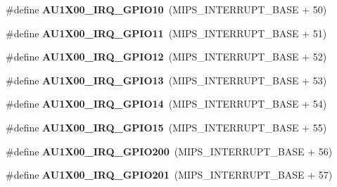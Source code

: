 \begin{DoxyCompactItemize}
\item 
\mbox{\label{group__bsp__interrupt_ga186ea493bfff4e9d0f015101ee9b39fb}} 
\#define {\bfseries A\+U1\+X00\+\_\+\+I\+R\+Q\+\_\+\+G\+P\+I\+O10}~(M\+I\+P\+S\+\_\+\+I\+N\+T\+E\+R\+R\+U\+P\+T\+\_\+\+B\+A\+SE + 50)
\item 
\mbox{\label{group__bsp__interrupt_ga75709136fa2a0302388f5482d91d5caf}} 
\#define {\bfseries A\+U1\+X00\+\_\+\+I\+R\+Q\+\_\+\+G\+P\+I\+O11}~(M\+I\+P\+S\+\_\+\+I\+N\+T\+E\+R\+R\+U\+P\+T\+\_\+\+B\+A\+SE + 51)
\item 
\mbox{\label{group__bsp__interrupt_ga9baa0287ccd46f700ad90bc943e0935a}} 
\#define {\bfseries A\+U1\+X00\+\_\+\+I\+R\+Q\+\_\+\+G\+P\+I\+O12}~(M\+I\+P\+S\+\_\+\+I\+N\+T\+E\+R\+R\+U\+P\+T\+\_\+\+B\+A\+SE + 52)
\item 
\mbox{\label{group__bsp__interrupt_gaff07113de52c2a2bf9b4946a01313802}} 
\#define {\bfseries A\+U1\+X00\+\_\+\+I\+R\+Q\+\_\+\+G\+P\+I\+O13}~(M\+I\+P\+S\+\_\+\+I\+N\+T\+E\+R\+R\+U\+P\+T\+\_\+\+B\+A\+SE + 53)
\item 
\mbox{\label{group__bsp__interrupt_ga2000ed0ba873113e01308e0e06d04e9e}} 
\#define {\bfseries A\+U1\+X00\+\_\+\+I\+R\+Q\+\_\+\+G\+P\+I\+O14}~(M\+I\+P\+S\+\_\+\+I\+N\+T\+E\+R\+R\+U\+P\+T\+\_\+\+B\+A\+SE + 54)
\item 
\mbox{\label{group__bsp__interrupt_gad16e7e770730ad66cc799c095445c061}} 
\#define {\bfseries A\+U1\+X00\+\_\+\+I\+R\+Q\+\_\+\+G\+P\+I\+O15}~(M\+I\+P\+S\+\_\+\+I\+N\+T\+E\+R\+R\+U\+P\+T\+\_\+\+B\+A\+SE + 55)
\item 
\mbox{\label{group__bsp__interrupt_gaa52ec127ce3d9d71e0908940683280ad}} 
\#define {\bfseries A\+U1\+X00\+\_\+\+I\+R\+Q\+\_\+\+G\+P\+I\+O200}~(M\+I\+P\+S\+\_\+\+I\+N\+T\+E\+R\+R\+U\+P\+T\+\_\+\+B\+A\+SE + 56)
\item 
\mbox{\label{group__bsp__interrupt_gaa346a2fcac5ecd6253c52c9735cdeff4}} 
\#define {\bfseries A\+U1\+X00\+\_\+\+I\+R\+Q\+\_\+\+G\+P\+I\+O201}~(M\+I\+P\+S\+\_\+\+I\+N\+T\+E\+R\+R\+U\+P\+T\+\_\+\+B\+A\+SE + 57)
\item 

\end{DoxyCompactItemize}
